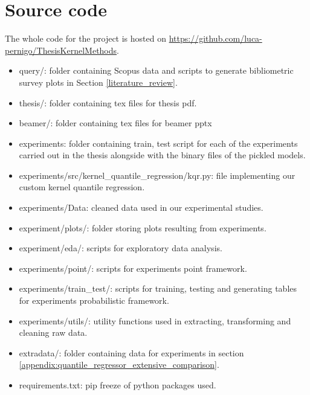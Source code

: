 \section{Source code}\label{src_code}
The whole code for the project is hosted on
\url{https://github.com/luca-pernigo/ThesisKernelMethods}\label{github_repo}.
\\
\begin{itemize}
    \item query/: folder containing Scopus data and scripts to generate bibliometric survey plots in Section \ref{literature_review}.
    \item thesis/: folder containing tex files for thesis pdf.
    \item beamer/: folder containing tex files for beamer pptx %
    \item experiments: folder containing train, test script for each of the experiments carried out in the thesis alongside with the binary files of the pickled models.
    \item experiments/src/kernel\_quantile\_regression/kqr.py: file implementing our custom kernel quantile regression.
    \item experiments/Data: cleaned data used in our experimental studies.
    \item experiment/plots/: folder storing plots resulting from experiments.
    \item experiment/eda/: scripts for exploratory data analysis.
    \item experiments/point/: scripts for experiments point framework.
    \item experiments/train\_test/: scripts for training, testing and generating tables for experiments probabilistic framework.
    \item experiments/utils/: utility functions used in extracting, transforming and cleaning raw data.
    \item extradata/: folder containing data for experiments in section \ref{appendix:quantile_regressor_extensive_comparison}.
    \item requirements.txt: pip freeze of python packages used.
\end{itemize}
